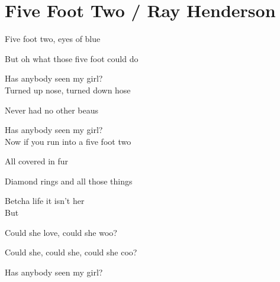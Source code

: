\section{Five Foot Two / Ray Henderson}\label{ch:five_foot_two}
\Cmajor
\Aseven
\Dseven
\Eseven
\Gseven
\Gaugmented

Five foot two, eyes of blue

But oh what those five foot could do

Has anybody seen my girl?\\


Turned up nose, turned down hose

Never had no other beaus

Has anybody seen my girl?\\


Now if you run into a five foot two

All covered in fur

Diamond rings and all those things

Betcha life it isn't her\\


But

Could she love, could she woo?

Could she, could she, could she coo?

Has anybody seen my girl?
